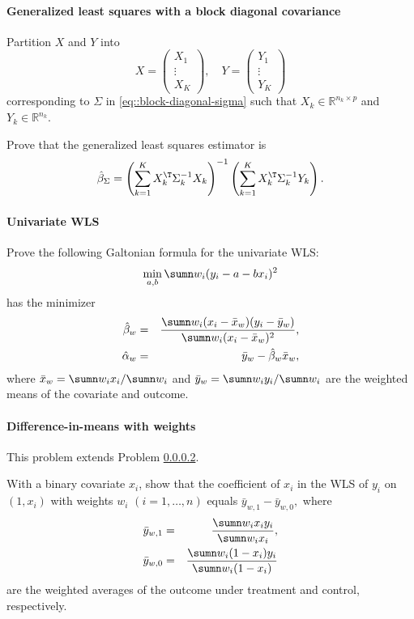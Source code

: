 
 

\paragraph{Generalized least squares with a block diagonal covariance}\label{hw16::gls-block-cov}

Partition $X$ and $Y$ into 
$$
X =  \begin{pmatrix}
X_1\\
\vdots \\
X_K
\end{pmatrix},\quad
Y = \begin{pmatrix}
Y_1\\
\vdots\\
Y_K
\end{pmatrix}
$$
corresponding to $\Sigma$ in \eqref{eq::block-diagonal-sigma} such that $X_k  \in \mathbb{R}^{ n_k\times p}$ and $Y_k\in  \mathbb{R}^{n_k}$. 

Prove that the generalized least squares estimator is
$$
\hat{\beta}_\Sigma = \left(\sum_{k=1}^K X_k ^{\T} \Sigma_k^{-1} X_k \right)^{-1} \left( \sum_{k=1}^K X_k ^{\T} \Sigma_k^{-1} Y_k \right).
$$


\paragraph{Univariate WLS}\label{hw16::univariate-wls}


Prove the following Galtonian formula for the univariate WLS:
$$
\min_{a,b}
\sumn w_i (y_i - a - b x_i)^2
$$
has the minimizer
\begin{eqnarray*}
\hat{\beta}_w &=& \frac{ \sumn w_i(x_i - \bar{x}_w) (y_i - \bar{y}_w) }{ \sumn w_i(x_i - \bar{x}_w)^2  },\\ 
\hat\alpha_w  &=& \bar{y}_w - \hat{\beta}_w  \bar{x}_w , 
\end{eqnarray*}
where $ \bar{x}_w = \sumn w_i x_i /  \sumn w_i   $ and $ \bar{y}_w = \sumn w_i y_i /  \sumn w_i $ are the weighted means of the covariate and outcome.



\paragraph{Difference-in-means with weights}\label{hw16::binaryx-wls}

This problem extends Problem \ref{hw16::univariate-wls}.


With a binary covariate $x_i$, show that the coefficient of $x_i$ in the WLS of $y_i$ on $(1,x_i)$ with weights $w_i$ $(i=1,\ldots, n)$ equals 
$
\bar{y}_{w,1} - \bar{y}_{w,0},
$
where
\begin{eqnarray*}
\bar{y}_{w,1}   &=&  \frac{ \sumn w_i x_i y_i  }{ \sumn w_i x_i } ,\\ 
\bar{y}_{w,0}  &=&  \frac{ \sumn w_i (1-x_i) y_i  }{ \sumn w_i (1-x_i) }
\end{eqnarray*}
are the weighted averages of the outcome under treatment and control, respectively. 



